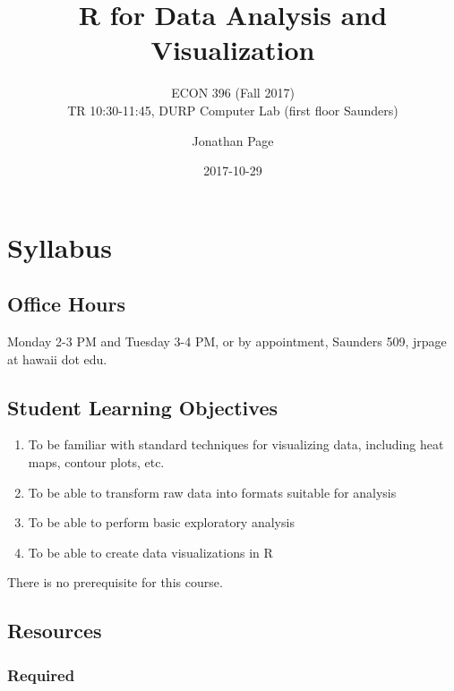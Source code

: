 \documentclass[]{book}
\title{R for Data Analysis and Visualization}
\subtitle{ECON 396 (Fall 2017)\\
TR 10:30-11:45, DURP Computer Lab (first floor Saunders)}
\author{Jonathan Page}
\date{2017-10-29}
\providecommand{\tightlist}{%
  \setlength{\itemsep}{0pt}\setlength{\parskip}{0pt}}
\theoremstyle{definition}
\theoremstyle{definition}
\theoremstyle{remark}
\begin{document}
\maketitle

{
\setcounter{tocdepth}{1}
\tableofcontents
}
\chapter*{Syllabus}\label{syllabus}

\section*{Office Hours}\label{office-hours}

Monday 2-3 PM and Tuesday 3-4 PM, or by appointment, Saunders 509,
jrpage at hawaii dot edu.

\section*{Student Learning
Objectives}\label{student-learning-objectives}

\begin{enumerate}
\def\labelenumi{\arabic{enumi}.}
\tightlist
\item
  To be familiar with standard techniques for visualizing data,
  including heat maps, contour plots, etc.
\item
  To be able to transform raw data into formats suitable for analysis
\item
  To be able to perform basic exploratory analysis
\item
  To be able to create data visualizations in R
\end{enumerate}

There is no prerequisite for this course.

\section*{Resources}\label{resources}

\subsection*{Required}\label{required}
\end{document}
